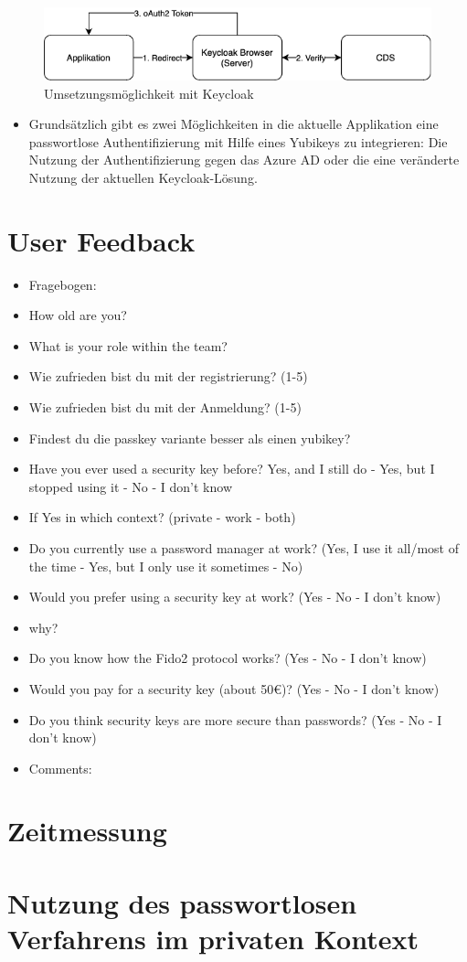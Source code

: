\begin{figure}[h]
	\centering 
	\includegraphics[width=1\textwidth]{img/abbildungen/keycloak_browser.png}
	\captionsetup{format=hang}
	\caption{Umsetzungsmöglichkeit mit Keycloak}
\end{figure}

\begin{itemize}
    \item Grundsätzlich gibt es zwei Möglichkeiten in die aktuelle Applikation eine passwortlose Authentifizierung mit Hilfe eines Yubikeys zu integrieren: Die Nutzung der Authentifizierung gegen das Azure \ac{AD} oder die eine veränderte Nutzung der aktuellen Keycloak-Lösung.
\end{itemize}

\section{User Feedback}
\begin{itemize}
    \item Fragebogen:
    \item How old are you?
    \item What is your role within the team?
    \item Wie zufrieden bist du mit der registrierung? (1-5)
    \item Wie zufrieden bist du mit der Anmeldung? (1-5)
    \item Findest du die passkey variante besser als einen yubikey?
    \item Have you ever used a security key before? Yes, and I still do - Yes, but I stopped using it - No - I don't know
    \item If Yes in which context? (private - work - both)
    \item Do you currently use a password manager at work? (Yes, I use it all/most of the time - Yes, but I only use it sometimes - No)
    \item Would you prefer using a security key at work? (Yes - No - I don't know)
    \item why?
    \item Do you know how the Fido2 protocol works? (Yes - No - I don't know)
    \item Would you pay for a security key (about 50€)? (Yes - No - I don't know)
    \item Do you think security keys are more secure than passwords? (Yes - No - I don't know)
    \item Comments:
\end{itemize}

\section{Zeitmessung}

\section{Nutzung des passwortlosen Verfahrens im privaten Kontext}